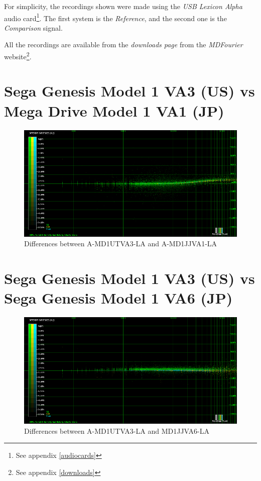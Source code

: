 \documentclass[10pt,a4paper]{report}
\begin{document}
For simplicity, the recordings shown were made using the \textit{USB Lexicon Alpha} audio card\footnote{See appendix \ref{audiocards}}. The first system is the \textit{Reference}, and the second one is the \textit{Comparison} signal.

All the recordings are available from the \textit{downloads page} from the \textit{MDFourier} website\footnote{See appendix \ref{downloads}}.

\section{Sega Genesis Model 1 VA3 (US) vs\\ Mega Drive Model 1 VA1 (JP)}

\begin{figure}[H]
	\centering
	\includegraphics[width=1.0\linewidth]{images/results/1-A-MD1UTVA3-LA_vs_A-MD1JJVA1_LA.png}
	\caption[A-MD1UTVA3-LA vs A-MD1JJVA1-LA]{Differences between A-MD1UTVA3-LA and A-MD1JJVA1-LA}
	\label{fig:A-MD1UTVA3-LA_vs_A-MD1JJVA1_LA}
\end{figure}

\section{Sega Genesis Model 1 VA3 (US) vs\\ Sega Genesis Model 1 VA6 (JP)}

\begin{figure}[H]
	\centering
	\includegraphics[width=1.0\linewidth]{images/results/2-A-MD1UTVA3-LA_vs_A-MD1JJVA6_LA.png}
	\caption[A-MD1UTVA3-LA vs A-MD1JJVA6-LA]{Differences between A-MD1UTVA3-LA and MD1JJVA6-LA}
	\label{fig:A-MD1UTVA3-LA_vs_A-MD1JJVA6_LA}
\end{figure}
\end{document}

